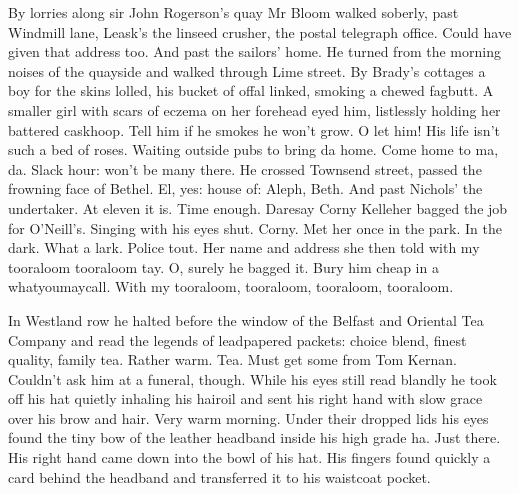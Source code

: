 By lorries along sir John Rogerson's quay Mr Bloom walked soberly, past
Windmill lane, Leask's the linseed crusher, the postal telegraph office.
Could have given that address too. And past the sailors' home. He turned
from the morning noises of the quayside and walked through Lime street.
By Brady's cottages a boy for the skins lolled, his bucket of offal
linked, smoking a chewed fagbutt. A smaller girl with scars of eczema on
her forehead eyed him, listlessly holding her battered caskhoop. Tell him
if he smokes he won't grow. O let him! His life isn't such a bed of
roses. Waiting outside pubs to bring da home. Come home to ma, da. Slack
hour: won't be many there. He crossed Townsend street, passed the
frowning face of Bethel. El, yes: house of: Aleph, Beth. And past
Nichols' the undertaker. At eleven it is. Time enough. Daresay Corny
Kelleher bagged the job for O'Neill's. Singing with his eyes shut. Corny.
Met her once in the park. In the dark. What a lark. Police tout. Her name
and address she then told with my tooraloom tooraloom tay. O, surely he
bagged it. Bury him cheap in a whatyoumaycall. With my tooraloom,
tooraloom, tooraloom, tooraloom.

In Westland row he halted before the window of the Belfast and Oriental
Tea Company and read the legends of leadpapered packets: choice blend,
finest quality, family tea. Rather warm. Tea. Must get some from Tom
Kernan. Couldn't ask him at a funeral, though. While his eyes still read
blandly he took off his hat quietly inhaling his hairoil and sent his
right hand with slow grace over his brow and hair. Very warm morning.
Under their dropped lids his eyes found the tiny bow of the leather
headband inside his high grade ha. Just there. His right hand came down
into the bowl of his hat. His fingers found quickly a card behind the
headband and transferred it to his waistcoat pocket.

